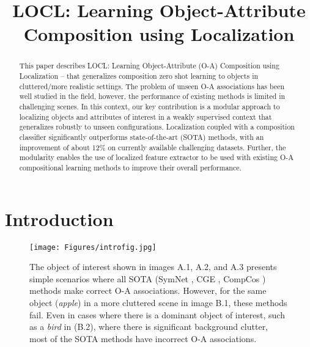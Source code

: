 \documentclass{bmvc2k}
\title{LOCL: Learning Object-Attribute Composition using Localization}
\begin{document}
\maketitle
 \begin{abstract}
 This paper describes LOCL: Learning Object-Attribute (O-A) Composition using Localization – that generalizes composition zero shot learning to objects in cluttered/more realistic settings. The problem of unseen O-A associations has been well studied in the field, however, the performance of existing methods is limited in challenging scenes. In this context, our key contribution is a modular approach to localizing objects and attributes of interest in a weakly supervised context that generalizes robustly to unseen configurations.  Localization coupled with a composition classifier significantly outperforms state-of-the-art (SOTA) methods, with an improvement of about 12\% on currently available challenging datasets. Further, the modularity enables the use of localized feature extractor to be used with existing O-A compositional learning methods to improve their overall performance. 



\end{abstract} \vspace{-0.4cm}
\section{Introduction}
\vspace{-0.1cm}
\begin{figure}[t]
\begin{center}
\texttt{[image: Figures/introfig.jpg]}
\end{center}
 \vspace{-0.4cm}
\caption{The object of interest shown in images A.1, A.2, and A.3 presents simple scenarios where all SOTA
    (SymNet \cite{li2020symmetry}, CGE \cite{naeem2021learning}, CompCos \cite{mancini2021learning}) methods make correct O-A associations. However, for the same object (\textit{apple}) in a more cluttered scene in  image B.1, these methods fail. Even in cases where there is a dominant object of interest, such as a \textit{bird} in  (B.2), where there is significant background clutter, most of the SOTA methods have incorrect O-A associations.}
  \vspace{-0.2cm}
\label{fig:concept}
\end{figure} 
\end{document}
